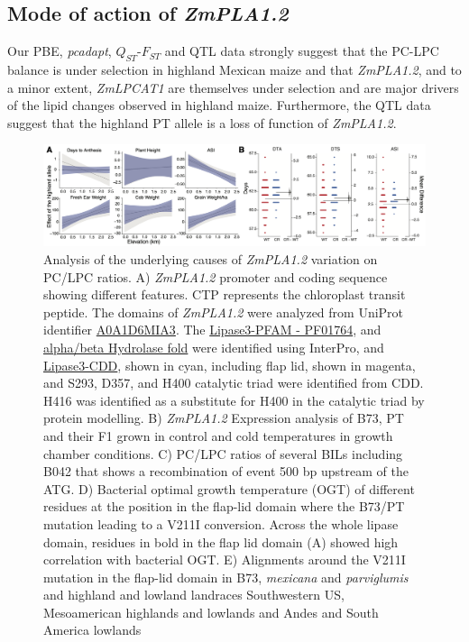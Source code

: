 \documentclass[9pt,twocolumn,twoside,lineno]{BioRxiv}
\begin{document}
\subsection{Mode of action of \textit{ZmPLA1.2}} 
Our PBE, \textit{pcadapt}, $Q_{ST}$-$F_{ST}$ and QTL data strongly suggest that the PC-LPC balance is under selection in highland Mexican maize and that \textit{ZmPLA1.2}, and to a minor extent, \textit{ZmLPCAT1} are themselves under selection and are major drivers of the lipid changes observed in highland maize. 
Furthermore, the QTL data suggest that the highland PT allele is a loss of function of \textit{ZmPLA1.2}. 
\begin{figure}[!ht]
\begin{center}
\includegraphics[width=0.8\paperwidth]{Figures/Fig_4.png}
\caption{Analysis of the underlying causes of \textit{ZmPLA1.2} variation on PC/LPC ratios.    
A) \textit{ZmPLA1.2} promoter and coding sequence showing different features. CTP represents the chloroplast transit peptide. The domains of \textit{ZmPLA1.2} were analyzed from UniProt identifier \hyperlink{https://www.uniprot.org/uniprot/A0A1D6MIA3}{A0A1D6MIA3}. The \hyperlink{https://www.ebi.ac.uk/interpro/entry/pfam/PF01764/}{Lipase3-PFAM - PF01764}, and \hyperlink{https://www.ebi.ac.uk/interpro/entry/InterPro/IPR029058/}{alpha/beta Hydrolase fold} were identified using InterPro, and \hyperlink{https://www.ncbi.nlm.nih.gov/Structure/cdd/cddsrv.cgi?uid=cd00519}{Lipase3-CDD}, shown in cyan, including flap lid, shown in magenta, and S293, D357, and H400 catalytic triad were identified from CDD. H416 was identified as a substitute for H400 in the catalytic triad by protein modelling.
B) \textit{ZmPLA1.2} Expression analysis of B73, PT and their F1 grown in control and cold temperatures in growth chamber conditions. 
C) PC/LPC ratios of several BILs including B042 that shows a recombination of event 500 bp upstream of the ATG.
D) Bacterial optimal growth temperature (OGT) of different residues at the position in the flap-lid domain where the B73/PT mutation leading to a V211I conversion. Across the whole lipase domain, residues in bold in the flap lid domain (A) showed high correlation with bacterial OGT. 
E) Alignments around the V211I mutation in the flap-lid domain in B73, \textit{mexicana} and \textit{parviglumis} and highland and lowland landraces Southwestern US, Mesoamerican highlands and lowlands and Andes and South America lowlands} 
\label{Fig4}
\end{center}
\end{figure} 
\end{document}
